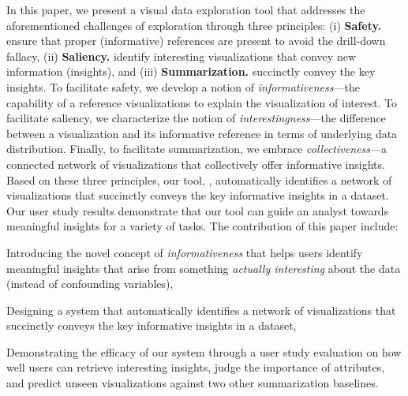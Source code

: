 \par In this paper, we present a visual data exploration tool that addresses the aforementioned challenges of exploration through three principles: (i) \textbf{Safety.} ensure that proper (informative) references are present to avoid the drill-down fallacy, (ii)  \textbf{Saliency.} identify interesting visualizations that convey new information (insights), and (iii) \textbf{Summarization.} succinctly convey the key insights. To facilitate safety, we develop a notion of \emph{informativeness}---the capability of a reference visualizations to explain the visualization of interest. To facilitate saliency, we characterize the notion of \emph{interestingness}---the difference between a visualization and its informative reference in terms of underlying data distribution. Finally, to facilitate summarization, we embrace \emph{collectiveness}---a connected network of visualizations that collectively offer informative insights. Based on these three principles, our tool, \system, automatically identifies a network of visualizations that succinctly conveys the key informative insights in a dataset. Our user study results demonstrate that our tool can guide an analyst towards meaningful insights for a variety of tasks. The contribution of this paper include:
\begin{denselist}
\item Introducing the novel concept of \emph{informativeness} that helps users identify meaningful insights that arise from something \textit{actually interesting} about the data (instead of confounding variables),
\item Designing a system that automatically identifies a network of visualizations that succinctly conveys the key informative insights in a dataset,
\item Demonstrating the efficacy of our system through a user study evaluation on how well users can retrieve interesting insights, judge the importance of attributes, and predict unseen visualizations against two other summarization baselines.
\end{denselist}



